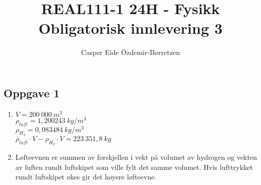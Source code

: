 \documentclass{report}%
\title{REAL111-1 24H - Fysikk\\Obligatorisk innlevering 3}
\author{Casper Eide Özdemir-Børretzen}
\date{}
\newcommand{\opg}[1]{\subsection*{Oppgave #1}}
\newcommand{\opgd}[1]{\item}
\begin{document}


\opg{1}
\begin{enumerate}[leftmargin=*,itemsep=1cm,labelsep=2em,label=\alph*)]
\opgd{a}
$V = 200\ 000\ m^3$\\
$\rho_{luft} = 1,200243\ kg/m^3$\\
$\rho_{H_2} = 0,083484\ kg/m^3$\\

$\rho_{luft} \cdot V - \rho_{H_2} \cdot V = 223\ 351,8\ kg$\\


\opgd{b}
Løfteevnen er summen av forskjellen i vekt på volumet av hydrogen og vekten av luften rundt luftskipet som ville fylt det samme volumet. Hvis lufttrykket rundt luftskipet økes gir det høyere løfteevne.
\end{enumerate}
\end{document}
